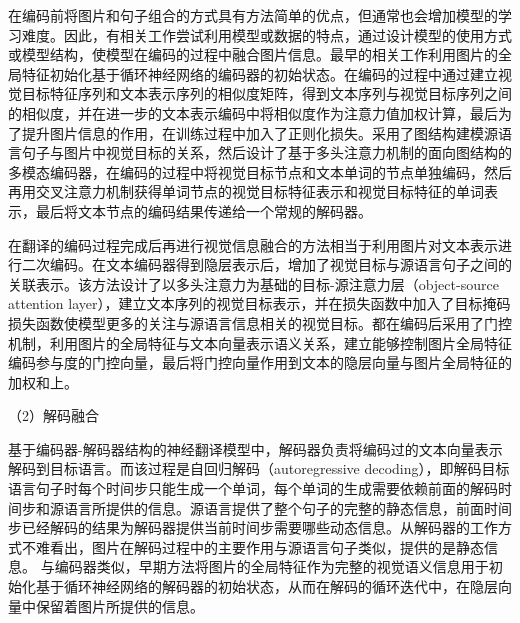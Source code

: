 在编码前将图片和句子组合的方式具有方法简单的优点，但通常也会增加模型的学习难度。因此，有相关工作尝试利用模型或数据的特点，通过设计模型的使用方式或模型结构，使模型在编码的过程中融合图片信息。最早的相关工作利用图片的全局特征初始化基于循环神经网络的编码器的初始状态。在编码的过程中通过建立视觉目标特征序列和文本表示序列的相似度矩阵，得到文本序列与视觉目标序列之间的相似度，并在进一步的文本表示编码中将相似度作为注意力值加权计算，最后为了提升图片信息的作用，在训练过程中加入了正则化损失。采用了图结构建模源语言句子与图片中视觉目标的关系，然后设计了基于多头注意力机制的面向图结构的多模态编码器，在编码的过程中将视觉目标节点和文本单词的节点单独编码，然后再用交叉注意力机制获得单词节点的视觉目标特征表示和视觉目标特征的单词表示，最后将文本节点的编码结果传递给一个常规的解码器。

在翻译的编码过程完成后再进行视觉信息融合的方法相当于利用图片对文本表示进行二次编码。在文本编码器得到隐层表示后，增加了视觉目标与源语言句子之间的关联表示。该方法设计了以多头注意力为基础的目标-源注意力层（object-source attention layer），建立文本序列的视觉目标表示，并在损失函数中加入了目标掩码损失函数使模型更多的关注与源语言信息相关的视觉目标。都在编码后采用了门控机制，利用图片的全局特征与文本向量表示语义关系，建立能够控制图片全局特征编码参与度的门控向量，最后将门控向量作用到文本的隐层向量与图片全局特征的加权和上。

{\sffamily （2）解码融合}

基于编码器-解码器结构的神经翻译模型中，解码器负责将编码过的文本向量表示解码到目标语言。而该过程是自回归解码（autoregressive decoding），即解码目标语言句子时每个时间步只能生成一个单词，每个单词的生成需要依赖前面的解码时间步和源语言所提供的信息。源语言提供了整个句子的完整的静态信息，前面时间步已经解码的结果为解码器提供当前时间步需要哪些动态信息。从解码器的工作方式不难看出，图片在解码过程中的主要作用与源语言句子类似，提供的是静态信息。
与编码器类似，早期方法将图片的全局特征作为完整的视觉语义信息用于初始化基于循环神经网络的解码器的初始状态，从而在解码的循环迭代中，在隐层向量中保留着图片所提供的信息。

